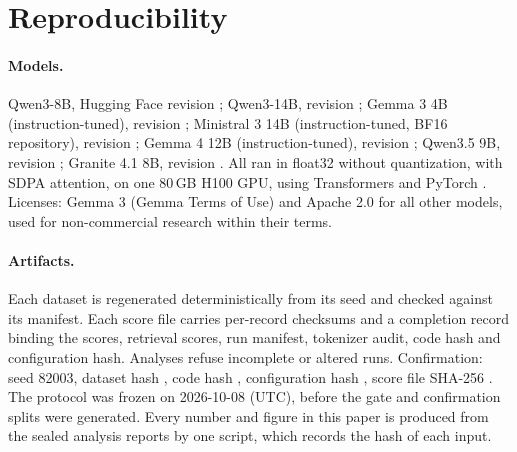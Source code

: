 \section{Reproducibility}
\label{app:repro}

\paragraph{Models.} Qwen3-8B, Hugging Face revision ; Qwen3-14B,
revision ; Gemma 3 4B (instruction-tuned), revision
; Ministral 3 14B (instruction-tuned, BF16 repository), revision
; Gemma 4 12B (instruction-tuned), revision
; Qwen3.5 9B, revision
; Granite 4.1 8B, revision
. All ran in float32 without
quantization, with SDPA attention, on one 80\,GB H100 GPU, using Transformers \citep{wolf2020transformers}
and PyTorch \citep{paszke2019pytorch}. Licenses: Gemma 3 (Gemma Terms of Use) and Apache 2.0 for all other models, used for
non-commercial research within their terms.

\paragraph{Artifacts.} Each dataset is regenerated deterministically from its seed and checked against
its manifest. Each score file carries per-record checksums and a completion record binding the scores,
retrieval scores, run manifest, tokenizer audit, code hash and configuration hash. Analyses refuse
incomplete or altered runs. Confirmation: seed 82003, dataset hash
, code hash , configuration hash , score file
SHA-256 . The protocol was frozen on 2026-10-08 (UTC), before the gate and
confirmation splits were generated. Every number and figure in this paper is produced from the sealed
analysis reports by one script, which records the hash of each input.

